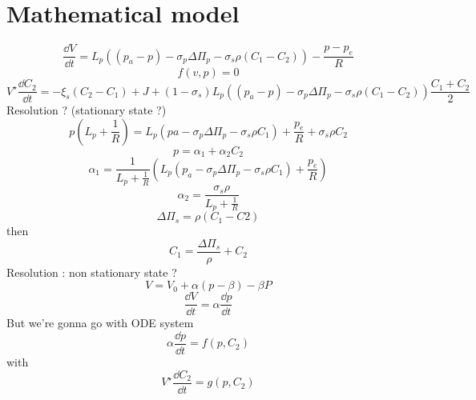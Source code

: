 \documentclass[11pt]{article}
\begin{document}
\section{Mathematical model}
\[
\frac{\dd V}{\dd t} = L_{p} \left( (p_{a} -p) - \sigma_{p} \Delta \Pi_{p} - \sigma_{s} \rho (C_{1}- C_{2}) \right) - \frac{p - p_{e} }{R}
\]
\[
f(v,p) = 0
\]
\[
V^\star \frac{\dd C_2}{\dd t} = - \xi_s (C_2-C_1) + J + \left(1- \sigma_s\right)L_p\left((p_a-p) - \sigma_p \Delta \Pi_p - \sigma_s \rho (C_1-C_2) \right) \frac{C_1 + C_2}{2}
\]
Resolution ? (stationary state ?)
\[
p\left( L_p + \frac{1}{R} \right) = L_p \left(pa - \sigma_p \Delta \Pi_p - \sigma_s \rho C_1\right) + \frac{p_e}{R} + \sigma_s \rho C_2
\]
\[
p = \alpha_1 + \alpha_2 C_2
\]
\[
\alpha_1 = \frac{1}{L_p + \frac{1}{R}} \left( L_p \left( p_a - \sigma_p \Delta \Pi_p - \sigma_s \rho C_1 \right) + \frac{p_e}{R}\right)
\]
\[
\alpha_2 = \frac{\sigma_s \rho}{L_p + \frac{1}{R}}
\]
\[
\Delta \Pi_s = \rho (C_1 - C2)
\]
then 
\[
C_1 = \frac{\Delta \Pi_s}{\rho} + C_2
\]
Resolution : non stationary state ? 
\[
V = V_0 + \alpha (p - \beta ) - \beta P
\]
\[
\frac{\dd V}{\dd t}= \alpha \frac{\dd p}{\dd t}
\]
But we're gonna go with ODE system
\[
\alpha \frac{\dd p}{\dd t} = f(p, C_2)
\]
with
\[
V^\star \frac{\dd C_2}{\dd t} = g(p, C_2)
\]
\end{document}
